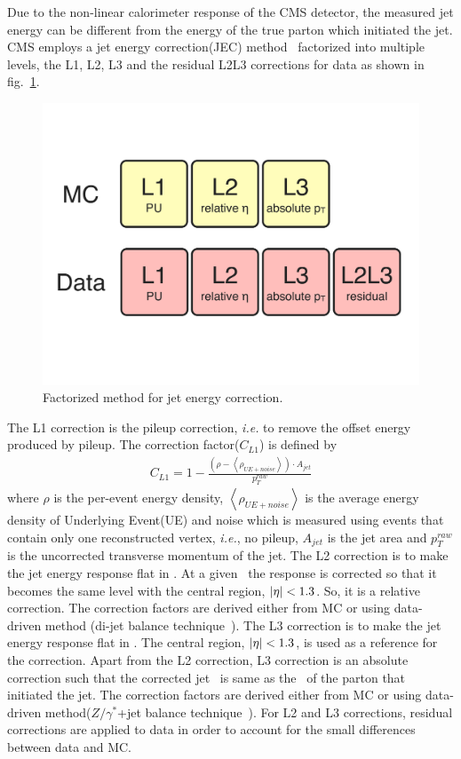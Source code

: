 Due to the non-linear calorimeter response of the CMS detector, 
the measured jet energy can be different from the energy of the true parton which 
initiated the jet. CMS employs a jet energy correction(JEC) 
method~\cite{Chatrchyan:1369486} factorized into multiple levels, 
the L1, L2, L3 and the residual L2L3 corrections for data as shown in fig.~\ref{fig:jec}. 
\begin{figure}[!hbtp]
\centering
\includegraphics[width=.95\textwidth]{figures/jec.pdf}
\caption{Factorized method for jet energy correction.}
\label{fig:jec}
\end{figure}

The L1 correction is the pileup correction, \textit{i.e.} to remove the offset energy 
produced by pileup. The correction factor($C_{L1}$) is defined by~\cite{Chatrchyan:1369486} 
\begin{eqnarray} 
C_{L1} = 1 - \frac{\left( \rho - \left<\rho_{UE+noise}\right>\right) \cdot A_{jet}}{p_T^{raw}}  \end{eqnarray} 
where $\rho$ is the per-event energy density, 
$\left<\rho_{UE+noise}\right>$ is the average energy density 
of Underlying Event(UE) and noise which is measured using events that contain only one 
reconstructed vertex, \textit{i.e.}, no pileup, 
$A_{jet}$ is the jet area
and $p_T^{raw}$ is the uncorrected transverse momentum of the jet. 
The L2 correction is to make the jet energy response flat in \Eta.  
At a given \Eta\, the response is corrected so that it becomes the same level 
with the central region, $|\eta|<1.3$. So, it is a relative correction.  
The correction factors are derived either from MC or using data-driven method
(di-jet balance technique~\cite{Chatrchyan:1369486}).
The L3 correction is to make the jet energy response flat in \pt.  
The central region, $|\eta|<1.3$, is used as a reference for the correction. 
Apart from the L2 correction, L3 correction is an absolute correction 
such that the corrected jet \pt\ is same as the \pt\ of the parton that 
initiated the jet. The correction factors are derived either from MC 
or using data-driven method($Z/\gamma^*$+jet balance technique~\cite{Chatrchyan:1369486}). 
For L2 and L3 corrections, 
residual corrections are applied to data in order to account for the small differences 
between data and MC. 

